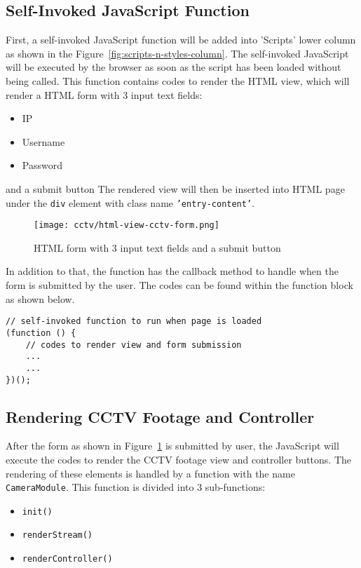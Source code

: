 \subsection{Self-Invoked JavaScript Function}
First, a self-invoked JavaScript function will be added into 'Scripts' lower column as shown in the Figure~\ref{fig:scripts-n-styles-column}. The self-invoked JavaScript will be executed by the browser as soon as the script has been loaded without being called. This function contains codes to render the HTML view, which will render a HTML form with 3 input text fields:
\begin{itemize}
\item IP
\item Username
\item Password
\end{itemize}
and a submit button The rendered view will then be inserted into HTML page under the \texttt{div} element with class name \texttt{'entry-content'}.

\begin{figure}[ht]
\caption{HTML form with 3 input text fields and a submit button}
\label{fig:html-view-cctv-form}
\centering
\texttt{[image: cctv/html-view-cctv-form.png]}
\end{figure}

In addition to that, the function has the callback method to handle when the form is submitted by the user. The codes can be found within the function block as shown below.
\begin{lstlisting}
// self-invoked function to run when page is loaded
(function () {
	// codes to render view and form submission
	...
	...
})();
\end{lstlisting}

\subsection{Rendering CCTV Footage and Controller} \label{sec:cctv-rendering-camera-module}
After the form as shown in Figure~\ref{fig:html-view-cctv-form} is submitted by user, the JavaScript will execute the codes to render the CCTV footage view and controller buttons. The rendering of these elements is handled by a function with the name \texttt{CameraModule}. This function is divided into 3 sub-functions:
\begin{itemize}
\item \texttt{init()}
\item \texttt{renderStream()}
\item \texttt{renderController()}
\end{itemize}

